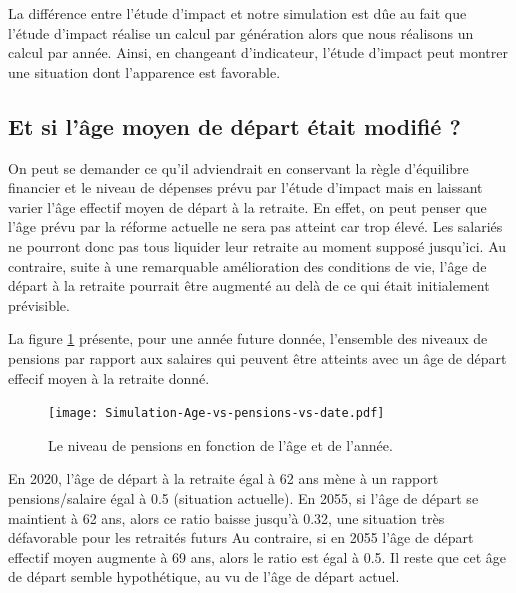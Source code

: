 \documentclass[10pt]{article}
\begin{document}
La différence entre l'étude d'impact et notre simulation est dûe au fait que 
l'étude d'impact réalise un calcul par génération alors que nous réalisons un calcul 
par année. 
Ainsi, en changeant d'indicateur, l'étude d'impact peut montrer une situation 
dont l'apparence est favorable. 


\subsection{Et si l'âge moyen de départ était modifié ?}

On peut se demander ce qu'il adviendrait en conservant la règle d'équilibre 
financier et le niveau de dépenses prévu par l'étude d'impact 
mais en laissant varier l'âge effectif moyen de départ à la retraite. 
En effet, on peut penser que l'âge prévu par la réforme actuelle 
ne sera pas atteint car trop élevé. 
Les salariés ne pourront donc pas tous liquider leur retraite au moment
supposé jusqu'ici. 
Au contraire, suite à une remarquable amélioration des conditions de vie, 
l'âge de départ à la retraite pourrait être augmenté au delà de ce qui 
était initialement prévisible. 

La figure \ref{fig-simulation-age-vs-pensions} présente, pour une année future donnée, 
l'ensemble des niveaux de pensions par rapport aux salaires qui peuvent être atteints avec 
un âge de départ effecif moyen à la retraite donné. 

\begin{figure}
\begin{center}
\texttt{[image: Simulation-Age-vs-pensions-vs-date.pdf]}
\end{center}

\caption{Le niveau de pensions en fonction de l'âge et de l'année.}
\label{fig-simulation-age-vs-pensions}
\end{figure}

En 2020, l'âge de départ à la retraite égal à 62 ans 
mène à un rapport pensions/salaire égal à 0.5 (situation actuelle).  
En 2055, si l'âge de départ se maintient à 62 ans, alors ce ratio baisse jusqu'à 0.32, 
une situation très défavorable pour les retraités futurs
Au contraire, si en 2055 l'âge de départ effectif moyen augmente à 69 ans, 
alors le ratio est égal à 0.5. 
Il reste que cet âge de départ semble hypothétique, au vu de l'âge de départ actuel. 
\end{document}
